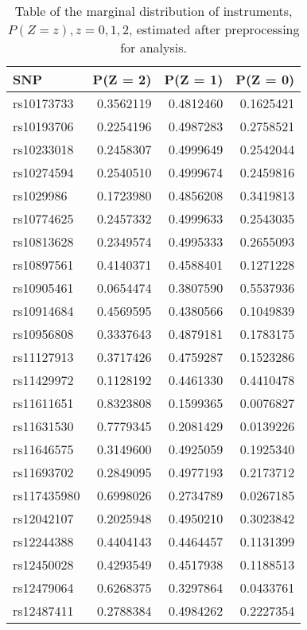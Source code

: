 \documentclass[AMA,STIX1COL,]{WileyNJD-v2}
\begin{document}
\begin{table}[ht]
  \caption{Table of the marginal distribution of instruments, $P(Z = z), z=0,1,2$,  estimated after preprocessing for analysis.}
  \label{tab:marginal-distribution-of-instruments-lung-cancer}
  \begin{minipage}{0.5\linewidth}
    \center
    
\begin{tabular}{lrrr}
\toprule
SNP & P(Z = 2) & P(Z = 1) & P(Z = 0)\\
\midrule
rs10173733 & 0.3562119 & 0.4812460 & 0.1625421\\
rs10193706 & 0.2254196 & 0.4987283 & 0.2758521\\
rs10233018 & 0.2458307 & 0.4999649 & 0.2542044\\
rs10274594 & 0.2540510 & 0.4999674 & 0.2459816\\
rs1029986 & 0.1723980 & 0.4856208 & 0.3419813\\
\addlinespace
rs10774625 & 0.2457332 & 0.4999633 & 0.2543035\\
rs10813628 & 0.2349574 & 0.4995333 & 0.2655093\\
rs10897561 & 0.4140371 & 0.4588401 & 0.1271228\\
rs10905461 & 0.0654474 & 0.3807590 & 0.5537936\\
rs10914684 & 0.4569595 & 0.4380566 & 0.1049839\\
\addlinespace
rs10956808 & 0.3337643 & 0.4879181 & 0.1783175\\
rs11127913 & 0.3717426 & 0.4759287 & 0.1523286\\
rs11429972 & 0.1128192 & 0.4461330 & 0.4410478\\
rs11611651 & 0.8323808 & 0.1599365 & 0.0076827\\
rs11631530 & 0.7779345 & 0.2081429 & 0.0139226\\
\addlinespace
rs11646575 & 0.3149600 & 0.4925059 & 0.1925340\\
rs11693702 & 0.2849095 & 0.4977193 & 0.2173712\\
rs117435980 & 0.6998026 & 0.2734789 & 0.0267185\\
rs12042107 & 0.2025948 & 0.4950210 & 0.3023842\\
rs12244388 & 0.4404143 & 0.4464457 & 0.1131399\\
\addlinespace
rs12450028 & 0.4293549 & 0.4517938 & 0.1188513\\
rs12479064 & 0.6268375 & 0.3297864 & 0.0433761\\
rs12487411 & 0.2788384 & 0.4984262 & 0.2227354\\

\end{tabular}
\end{minipage}
\end{table}
\end{document}
